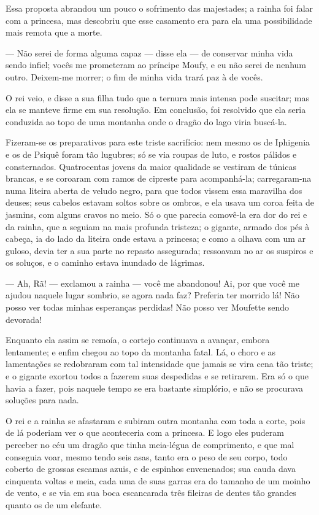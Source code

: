 Essa proposta abrandou um pouco o sofrimento das majestades; a rainha
foi falar com a princesa, mas descobriu que esse casamento era para
ela uma possibilidade mais remota que a morte. 

— Não serei de forma alguma capaz — disse ela — de conservar minha
vida sendo infiel; vocês me prometeram ao príncipe Moufy, e eu não
serei de nenhum outro. Deixem-me morrer; o fim de minha vida trará
paz à de vocês. 

O rei veio, e disse a sua filha tudo que a ternura mais intensa pode
suscitar; mas ela se manteve firme em sua resolução. Em conclusão,
foi resolvido que ela seria conduzida ao topo de uma montanha onde o
dragão do lago viria buscá-la. 

Fizeram-se os preparativos para este triste sacrifício: nem mesmo os
de Iphigenia e os de Psiquê foram tão lugubres; só se via roupas de
luto, e rostos pálidos e consternados. Quatrocentas jovens da maior
qualidade se vestiram de túnicas brancas, e se coroaram com ramos de
cipreste para acompanhá-la; carregaram-na numa liteira aberta de
veludo negro, para que todos vissem essa maravilha dos deuses; seus
cabelos estavam soltos sobre os ombros, e ela usava um coroa feita de
jasmins, com alguns cravos no meio. Só o que parecia comovê-la era
dor do rei e da rainha, que a seguiam na mais profunda tristeza; o
gigante, armado dos pés à cabeça, ia do lado da liteira onde estava a
princesa; e como a olhava com um ar guloso, devia ter a sua parte no
repasto assegurada; ressoavam no ar os suspiros e os soluços, e o
caminho estava inundado de lágrimas. 

— Ah, Rã! — exclamou a rainha — você me abandonou! Ai, por que você me
ajudou naquele lugar sombrio, se agora nada faz? Preferia ter morrido
lá! Não posso ver todas minhas esperanças perdidas! Não posso ver
Moufette sendo devorada! 

Enquanto ela assim se remoía, o cortejo continuava a avançar, embora
lentamente; e enfim chegou ao topo da montanha fatal. Lá, o choro e
as lamentações se redobraram com tal intensidade que jamais se vira
cena tão triste; e o gigante exortou todos a fazerem suas despedidas
e se retirarem. Era só o que havia a fazer, pois naquele tempo se era
bastante simplório, e não se procurava soluções para nada.

O rei e a rainha se afastaram e subiram outra montanha com toda a
corte, pois de lá poderiam ver o que aconteceria com a princesa. E
logo eles puderam perceber no céu um dragão que tinha meia-légua de
comprimento, e que mal conseguia voar, mesmo tendo seis asas, tanto
era o peso de seu corpo, todo coberto de grossas escamas azuis, e de
espinhos envenenados; sua cauda dava cinquenta voltas e meia, cada
uma de suas garras era do tamanho de um moinho de vento, e se via em
sua boca escancarada três fileiras de dentes tão grandes quanto os de
um elefante. 

